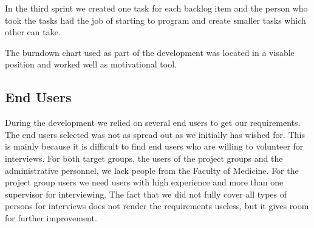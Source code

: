 In the third sprint we created one task for each backlog item and the person who took the tasks had the job of starting to program and create smaller tasks which other can take. 

The burndown chart used as part of the development was located in a visable position and worked well as motivational tool.


\subsection{End Users}
During the development we relied on several end users to get our requirements. 
The end users selected was not as spread out as we initially has wished for. 
This is mainly because it is difficult to find end users who are willing to volunteer for interviews. 
For both target groups, the users of the project groups and the administrative personnel, we lack people from the Faculty of Medicine.
For the project group users we need users with high experience and more than one supervisor for interviewing. 
The fact that we did not fully cover all types of persons for interviews does not render the requirements useless, but it gives room for further improvement. 












